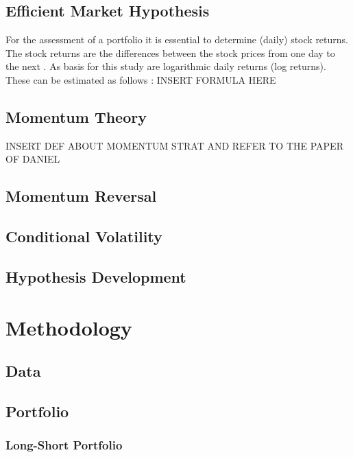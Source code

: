 \documentclass[12pt]{article}
\begin{document}
\subsection{Efficient Market Hypothesis} \label{subsection:EMH}
For the assessment of a portfolio it is essential to determine (daily) stock returns. The stock returns are the differences between the stock prices from one day to the next \parencite{Tsay2002}. As basis for this study are logarithmic daily returns (log returns). These can be estimated as follows \parencite{Tsay2002}: 
INSERT FORMULA HERE



\subsection{Momentum Theory} \label{subsection:Momentum_theory}

INSERT DEF ABOUT MOMENTUM STRAT
AND REFER TO THE PAPER OF DANIEL


\subsection{Momentum Reversal} \label{subsection:Momentum_reversal}

\subsection{Conditional Volatility} \label{subsection:condvol}


\subsection{Hypothesis Development} \label{subsection:Hypotheses}


\section{Methodology} \label{section:Method}

\subsection{Data} \label{subsection:Data}

\subsection{Portfolio} \label{subsection:Portfolio}

\subsubsection{Long-Short Portfolio} \label{subsubsection:LS_portfolio}
\end{document}
